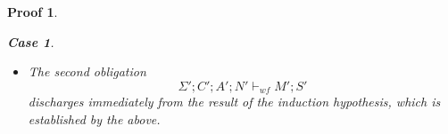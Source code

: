 \documentclass[showabstract,showacknowledgments,showpreface,showdedication,school]{iuphd}
\makeatletter
\newtheorem*{bcase}{Case}
\theoremstyle{nonumberplain}
\newtheorem{nproof}{Proof}
\newcommand{\keywd}[1]{\mathit{#1}}
\newcommand{\skeywd}[1]{\mathit{#1}}
\newcommand{\EXPR}{\keywd{e}}
\newcommand{\TYP}{\keywd{\tau}}
\newcommand{\var}{\svar}
\newcommand{\svar}{x}
\newcommand{\loc}{\skeywd{l}}
\newcommand{\reg}{\skeywd{r}}
\newcommand{\STOR}{\keywd{S}}
\newcommand\set[1]{\{ \, \ensuremath{#1} \,\}}
\newcommand{\CENV}{\keywd{C}}
\newcommand{\TENV}{\keywd{\Gamma}}
\newcommand{\SENV}{\keywd{\Sigma}}
\newcommand{\MENV}{\keywd{M}}
\newcommand{\AENV}{\keywd{A}}
\newcommand{\NENV}{\keywd{N}}
\newcommand{\locreg}[2]{\ensuremath{{#1}^{#2}}}
\newcommand{\tyatlocreg}[3]{#1 \ensuremath{@} \locreg{#2}{#3}}
\newcommand{\storewf}[6]{\ensuremath{#1;#2;#3;#4 \vdash_{wf} #5;#6}}
\newcommand{\tlet}{T-Let}
\newcommand{\emptytenv}{\emptyset}
\makeatother
\begin{document}
\begin{nproof}
\begin{bcase}
\begin{itemize}
        \begin{displaymath}
      \begin{aligned}
        \text{For some} \;\; & \SENV' \supseteq \SENV, \CENV' \supseteq \CENV ,\\
        & \emptytenv;\SENV';\CENV';\AENV';\NENV' \vdash \AENV'';\NENV'';\EXPR_1' : \tyatlocreg{\TYP_1}{\loc_1}{\reg_1} \\
        \text{and} \;\; & \storewf{\SENV'}{\CENV'}{\AENV'}{\NENV'}{\MENV'}{\STOR'}.
      \end{aligned}
    \end{displaymath}
    By inversion on \tlet{}, we also have that
    \begin{align*}
    \TENV';\SENV';\CENV;\AENV';\NENV' \vdash \AENV'';\NENV'';\EXPR_2 : \tyatlocreg{\TYP_2}{\loc_2}{\reg_2},
    \end{align*}
    where
    \begin{align*}
    \TENV' &= \set{\var \mapsto \tyatlocreg{\TYP_1}{\loc_1}{\reg_1}} \\
    \SENV' &= \set{\locreg{\loc_1}{\reg_1} \mapsto \TYP_1}.
    \end{align*}
    By inspection on \tlet{} and the previous two typing judgements, that is, for $\EXPR_1'$
    and $\EXPR_2$, we discharge this case.
    \item The second obligation
    \begin{displaymath}
    \storewf{\SENV'}{\CENV'}{\AENV'}{\NENV'}{\MENV'}{\STOR'}
    \end{displaymath}
    discharges immediately from the result of the induction hypothesis, which is
    established by the above.
    \end{itemize}
  \end{bcase}


\end{nproof}
\end{document}
